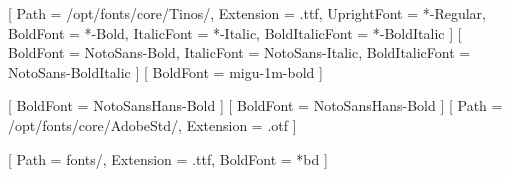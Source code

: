 \usepackage{fontspec}

\setmainfont{Tinos}[ %
  Path = /opt/fonts/core/Tinos/,
  Extension = .ttf,
  UprightFont = *-Regular,
  BoldFont = *-Bold,
  ItalicFont = *-Italic,
  BoldItalicFont = *-BoldItalic
]
\setsansfont{NotoSans}[ %
  BoldFont = NotoSans-Bold,
  ItalicFont = NotoSans-Italic,
  BoldItalicFont = NotoSans-BoldItalic  
]
\setmonofont{migu-1m-regular}[
  BoldFont = migu-1m-bold
]

%


\usepackage[boldfont]{xeCJK}
[ %
BoldFont = NotoSansHans-Bold %
]
[
  BoldFont = NotoSansHans-Bold
]
[
  Path = /opt/fonts/core/AdobeStd/,
  Extension = .otf
]

[ %
  Path = fonts/,
  Extension = .ttf,
  BoldFont = {*bd}
]


%


